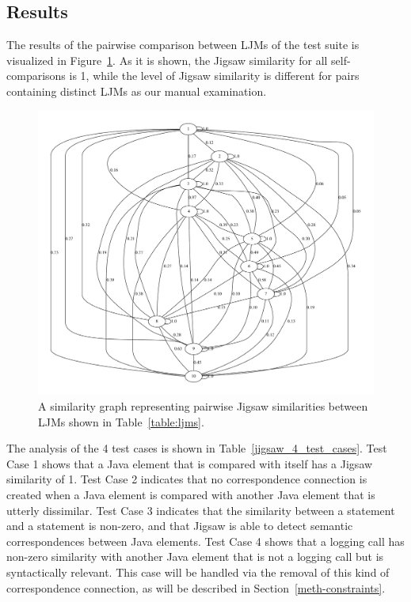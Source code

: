 \subsection{Results}  \label{study1-results}
The results of the pairwise comparison between LJMs of the test suite is visualized in Figure~\ref{fig:jigsaw_graph}. As it is shown, the Jigsaw similarity for all self-comparisons is 1, while  the level of Jigsaw similarity is different for pairs containing distinct LJMs as our manual examination.

\begin{figure} [H]
  \centering\includegraphics [width = \textwidth]{graphviz/jigsaw.pdf}
  \caption{A similarity graph representing pairwise Jigsaw similarities between LJMs shown in Table~\ref{table:ljms}.}
  \label{fig:jigsaw_graph}
\end{figure}


The analysis of the 4 test cases is shown in Table~\ref{jigsaw_4_test_cases}. Test Case 1 shows that a Java element that is compared with itself has a Jigsaw similarity of 1. Test Case 2 indicates that no correspondence connection is created when a Java element is compared with another Java element that is utterly dissimilar. Test Case 3 indicates that the similarity between a  statement and a  statement is non-zero, and that Jigsaw is able to detect semantic correspondences between Java elements. Test Case 4 shows that a logging call has non-zero similarity with another Java element that is not a logging call but is syntactically relevant. This case will be handled via the removal of this kind of correspondence connection, as will be described in Section~\ref{meth-constraints}.

